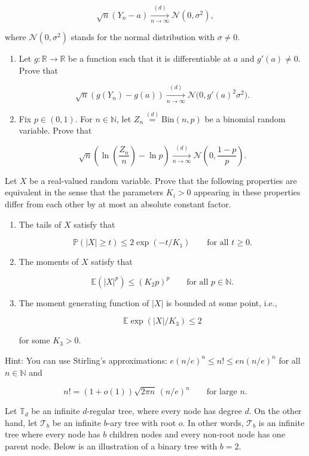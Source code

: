 \documentclass[11pt,a4paper]{article}
\newcommand{\examstatement}[1]{%
  \par\addvspace{0.85em}%
  \noindent{\bfseries #1}\par\nobreak\addvspace{0.28em}%
}
\begin{document}
\[
\sqrt{n}(Y_n - a) \xrightarrow[n \to \infty]{(d)} \mathcal{N}(0, \sigma^2),
\]

where \( \mathcal{N}(0, \sigma^2) \) stands for the normal distribution with \( \sigma \neq 0 \).
\begin{enumerate}[label=(\alph*)]
    \item Let \( g : \mathbb{R} \to \mathbb{R} \) be a function such that it is differentiable at \( a \) and \( g'(a) \neq 0 \). Prove that

    \[
    \sqrt{n}(g(Y_n) - g(a)) \xrightarrow[n \to \infty]{(d)} \mathcal{N}\bigl(0, g'(a)^2 \sigma^2\bigr).
    \]
    \item Fix \( p \in (0, 1) \). For \( n \in \mathbb{N} \), let \( Z_n \stackrel{(d)}{=} \mathrm{Bin}(n, p) \) be a binomial random variable. Prove that

    \[
    \sqrt{n} \left( \ln\left(\frac{Z_n}{n}\right) - \ln p \right) \xrightarrow[n \to \infty]{(d)} \mathcal{N}\left(0, \frac{1-p}{p}\right).
    \]
\end{enumerate}

\examstatement{Problem 3. [10 pts.]}
Let \( X \) be a real-valued random variable. Prove that the following properties are equivalent in the sense that the parameters \( K_i > 0 \) appearing in these properties differ from each other by at most an absolute constant factor.
\begin{enumerate}[label=(\alph*)]
    \item The tails of \( X \) satisfy that

    \[
    \mathbb{P}(|X| \ge t) \le 2 \exp(-t/K_1) \qquad \text{for all } t \ge 0.
    \]
    \item The moments of \( X \) satisfy that

    \[
    \mathbb{E}(|X|^p) \le (K_2 p)^p \qquad \text{for all } p \in \mathbb{N}.
    \]
    \item The moment generating function of \( |X| \) is bounded at some point, i.e.,

    \[
    \mathbb{E} \exp(|X|/K_3) \le 2
    \]

    for some \( K_3 > 0 \).
\end{enumerate}
Hint: You can use Stirling's approximations: \( e(n/e)^n \le n! \le e n (n/e)^n \) for all \( n \in \mathbb{N} \) and

\[
n! = (1+o(1))\sqrt{2\pi n}\,(n/e)^n \qquad \text{for large } n.
\]

\examstatement{Problem 4. [10 pts.]}
Let \( \mathbb{T}_d \) be an infinite \( d \)-regular tree, where every node has degree \( d \). On the other hand, let \( \mathcal{T}_b \) be an infinite \( b \)-ary tree with root \( o \). In other words, \( \mathcal{T}_b \) is an infinite tree where every node has \( b \) children nodes and every non-root node has one parent node. Below is an illustration of a binary tree with \( b = 2 \).
\end{document}
